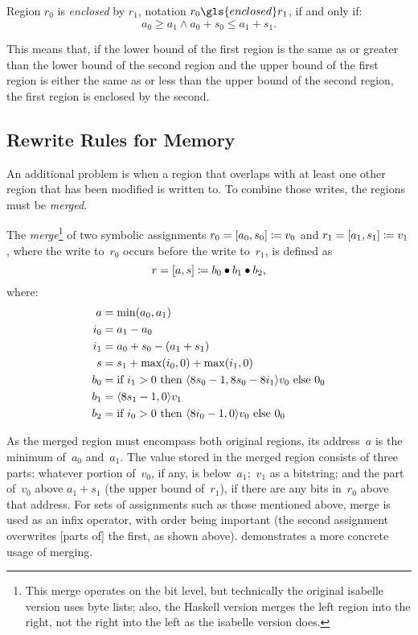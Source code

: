 \begin{definition}[Enclosure]\label{def:enc}
  Region $r_0$ is \emph{enclosed} by $r_1$, notation $r_0\gls{enclosed}r_1$,%
  if and only if:
  \begin{equation*}
    a_0\geq a_1\land a_0+s_0\leq a_1+s_1.
  \end{equation*}
\end{definition}
This means that, if the lower bound of the first region is the same as
or greater than the lower bound of the second region
and the upper bound of the first region is either the same as or less than
the upper bound of the second region, the first region is enclosed by the second.

\subsection{Rewrite Rules for Memory}\label{memory_rewrite}
An additional problem is when a region that overlaps with at least one other region
that has been modified is written to.
To combine those writes, the regions must be \emph{merged}.%
\begin{definition}[Merging]\label{def:merge}
  The \emph{merge}\footnote{%
    This merge operates on the bit level,
    but technically the original \gls{isabelle} version uses byte lists;
    also, the Haskell version merges the left region into the right,
    not the right into the left as the \gls{isabelle} version does.%
  }
  of two symbolic assignments
  $r_0=[a_0,s_0]\coloneqq v_0$ and $r_1=[a_1,s_1]\coloneqq v_1$,
  where the write to~$r_0$ occurs before the write to~$r_1$,
  is defined as
  \begin{equation}
    r=[a,s]\coloneqq b_0\bullet b_1\bullet b_2,
  \end{equation}
  where:
  \begin{align*}
    a   &= \min(a_0, a_1) \\
    i_0 &= a_1 - a_0 \\
    i_1 &= a_0 + s_0 - (a_1 + s_1) \\
    s   &= s_1 + \max(i_0, 0) + \max(i_1, 0) \\
    b_0 &= \text{if } i_1 > 0 \text{ then }
      \langle8 s_0 - 1, 8 s_0 - 8 i_1\rangle v_0 \text{ else } 0_0 \\
    b_1 &= \langle8 s_1 - 1, 0\rangle v_1 \\
    b_2 &= \text{if } i_0 > 0 \text{ then }
      \langle8 i_0-1, 0\rangle v_0 \text{ else } 0_0
  \end{align*}
\end{definition}
As the merged region must encompass both original regions,
its address~$a$ is the minimum of~$a_0$ and~$a_1$.
The value stored in the merged region consists of three parts:
whatever portion of~$v_0$, if any, is below~$a_1$;~$v_1$ as a bitstring;
and the part of~$v_0$ above $a_1+s_1$ (the upper bound of~$r_1$),
if there are any bits in~$r_0$ above that address.
For sets of assignments such as those mentioned above,
merge is used as an infix operator, with order being important
(the second assignment overwrites [parts of] the first, as shown above).
 demonstrates a more concrete usage of merging.

